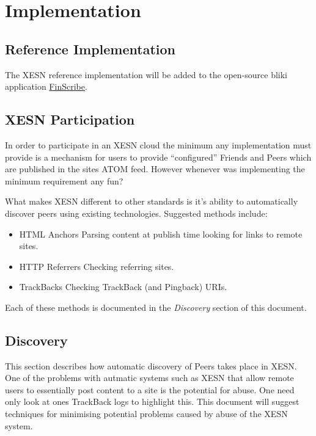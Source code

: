 \documentclass[titlepage,english,a4paper,twoside,dvips]{article}
\begin{document}
\section{Implementation}

\subsection{Reference Implementation}

The XESN reference implementation will be added to the open-source bliki application \href{http://hww3.riverweb.com/space/pike/FinScribe}{FinScribe}.

\subsection{XESN Participation}

In order to participate in an XESN cloud the minimum any implementation must provide is a mechanism for users to provide ``configured'' Friends and Peers which are published in the sites ATOM feed.  However whenever was implementing the minimum requirement any fun?

What makes XESN different to other standards is it's ability to automatically discover peers using existing technologies.  Suggested methods include:

\begin{itemize}

\item{HTML Anchors} Parsing content at publish time looking for links to remote sites.

\item{HTTP Referrers} Checking referring sites.

\item{TrackBacks} Checking TrackBack (and Pingback) URIs.

\end{itemize}

Each of these methods is documented in the \emph{Discovery} section of this document. 

\subsection{Discovery}

This section describes how automatic discovery of Peers takes place in XESN.  One of the problems with autmatic systems such as XESN that allow remote users to essentially post content to a site is the potential for abuse.  One need only look at ones TrackBack logs to highlight this.  This document will suggest techniques for minimising potential problems caused by abuse of the XESN system.
\end{document}

